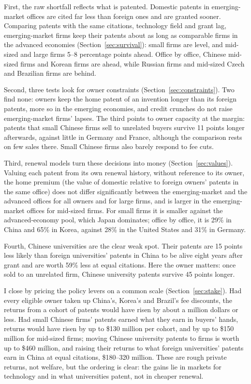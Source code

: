 First, the raw shortfall reflects what is patented. Domestic patents in emerging-market offices are cited far less
than foreign ones and are granted sooner. Comparing patents with the same citations, technology field and grant lag,
emerging-market firms keep their patents about as long as comparable firms in the advanced economies
(Section~\ref{sec:survival}): small firms are level, and mid-sized and large firms 5--8 percentage points ahead.
Office by office, Chinese mid-sized firms and Korean firms are ahead, while Russian firms and mid-sized Czech and Brazilian firms are behind.

Second, three tests look for owner constraints (Section~\ref{sec:constraints}). Two find none: owners keep the home
patent of an invention longer than its foreign patents, more so in the emerging economies, and credit crunches do not
raise emerging-market firms' lapses. The third points to owner capacity at the margin: patents that small Chinese
firms sell to unrelated buyers survive 11 points longer afterwards, against little in Germany and France, although the
comparison rests on few sales there. Small Chinese firms also barely respond to fee cuts.

Third, renewal models turn these decisions into money (Section~\ref{sec:values}). Valuing each patent from its own
renewal history, without reference to its owner, the home premium (the value of domestic relative to foreign owners'
patents in the same office) does not differ significantly between the emerging-market and the advanced offices for
all owners and for large firms, and is larger in the emerging-market offices for mid-sized firms. For small firms it
is smaller against the advanced-economy pool, which Japan dominates; office by office, it is 29\% in China and 65\%
in Korea, against 28\% in the United States and 31\% in Germany.

Fourth, Chinese universities are the clear weak spot. Their patents are 15 points less likely than foreign
universities' patents in China to be alive eight years after grant and are worth 59\% less at equal citations. Here
the owner matters: once sold to an unrelated firm, Chinese university patents survive 45 points longer.

I close by pricing the policy levers on a common scale (Section~\ref{sec:stake}). Had every eligible owner taken up
China's, Korea's and Brazil's fee discounts, the returns from a cohort of patents would have risen by about a million
dollars or less. Had small Chinese firms' patents earned what they earn in buyers' hands, returns would have risen by up to \$130 million per cohort, and by up to \$150 million for mid-sized firms; moving Chinese university patents to firms is worth
up to \$460 million, and raising their returns to what foreign universities' patents earn in China at equal
citations, \$180--320 million. These are
rough private returns, not welfare, but the ordering is clear: the gains lie in markets for technology and in what
universities patent, not in cheaper renewal.


